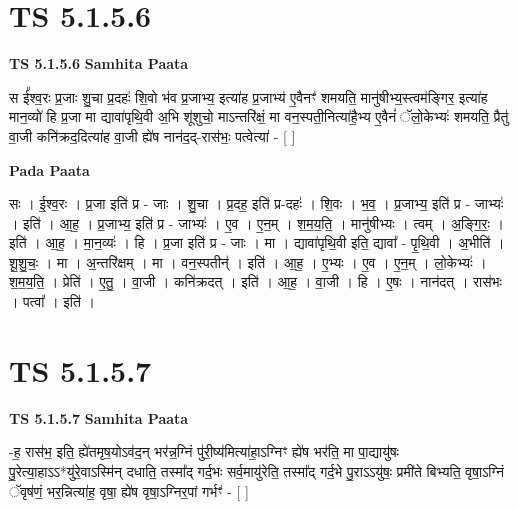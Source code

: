 \documentclass[17pt]{extarticle}
\begin{document}
\section*{ TS 5.1.5.6 }

\textbf{TS 5.1.5.6 } \newline
\textbf{Samhita Paata} \newline

स ई᳚श्व॒रः प्र॒जाः शु॒चा प्र॒दहः॑ शि॒वो भ॑व प्र॒जाभ्य॒ इत्या॑ह प्र॒जाभ्य॑ ए॒वैनꣳ॑ शमयति॒ मानु॑षीभ्य॒स्त्वम॑ङ्गिर॒ इत्या॑ह मान॒व्यो॑ हि प्र॒जा मा द्यावा॑पृथि॒वी अ॒भि शू॑शुचो॒ माऽन्तरि॑क्षं॒ मा वन॒स्पती॒नित्या॑है॒भ्य ए॒वैनं॑ ॅलो॒केभ्यः॑ शमयति॒ प्रैतु॑ वा॒जी कनि॑क्रद॒दित्या॑ह वा॒जी ह्ये॑ष नान॑द॒द्-रास॑भः॒ पत्वेत्या॑ - [  ] \newline

\textbf{Pada Paata} \newline

सः । ई॒श्व॒रः । प्र॒जा इति॑ प्र - जाः । शु॒चा । प्र॒दह॒ इति॑ प्र-दहः॑ । शि॒वः । भ॒व॒ । प्र॒जाभ्य॒ इति॑ प्र - जाभ्यः॑ । इति॑ । आ॒ह॒ । प्र॒जाभ्य॒ इति॑ प्र - जाभ्यः॑ । ए॒व । ए॒न॒म् । श॒म॒य॒ति॒ । मानु॑षीभ्यः । त्वम् । अ॒ङ्गि॒रः॒ । इति॑ । आ॒ह॒ । मा॒न॒व्यः॑ । हि । प्र॒जा इति॑ प्र - जाः । मा । द्यावा॑पृथि॒वी इति॒ द्यावा᳚ - पृ॒थि॒वी । अ॒भीति॑ । शू॒शु॒चः॒ । मा । अ॒न्तरि॑क्षम् । मा । वन॒स्पतीन्॑ । इति॑ । आ॒ह॒ । ए॒भ्यः । ए॒व । ए॒न॒म् । लो॒केभ्यः॑ । श॒म॒य॒ति॒ । प्रेति॑ । ए॒तु॒ । वा॒जी । कनि॑क्रदत् । इति॑ । आ॒ह॒ । वा॒जी । हि । ए॒षः । नान॑दत् । रास॑भः । पत्वा᳚ । इति॑ ।  \newline




\section*{ TS 5.1.5.7 }

\textbf{TS 5.1.5.7 } \newline
\textbf{Samhita Paata} \newline

-ह॒ रास॑भ॒ इति॒ ह्ये॑तमृष॒योऽव॑द॒न् भर॑न्न॒ग्निं पु॑री॒ष्य॑मित्या॑हा॒ऽग्निꣳ ह्ये॑ष भर॑ति॒ मा पा॒द्यायु॑षः पु॒रेत्या॒हाऽऽ*यु॑रे॒वाऽस्मि॑न् दधाति॒ तस्मा᳚द् गर्द॒भः सर्व॒मायु॑रेति॒ तस्मा᳚द् गर्द॒भे पु॒राऽऽयु॑षः॒ प्रमी॑ते बिभ्यति॒ वृषा॒ऽग्निं ॅवृष॑णं॒ भर॒न्नित्या॑ह॒ वृषा॒ ह्ये॑ष वृषा॒ऽग्निर॒पां गर्भꣳ॑ - [  ] \newline
\end{document}
